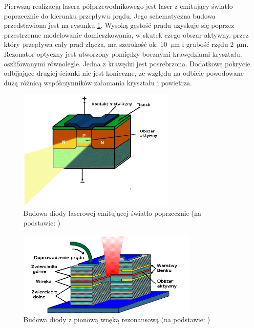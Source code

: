 \documentclass[a4paper,10pt]{article}
\begin{document}
Pierwszą realizacją lasera półprzewodnikowego jest laser z emitujący światło poprzecznie do kierunku przepływu prądu. Jego schematyczna budowa przedstawiona jest na rysunku \ref{rys-eel}. Wysoką gęstość prądu uzyskuje się poprzez przestrzenne modelowanie domieszkowania, w skutek czego obszar aktywny, przez który przepływa cały prąd złącza, ma szerokość ok. 10~$\mathrm{\mu m}$ i grubość rzędu 2~$\mathrm{\mu m}$. Rezonator optyczny jest utworzony pomiędzy bocznymi krawędziami kryształu, oszlifowanymi równolegle. Jedna z krawędzi jest posrebrzona. Dodatkowe pokrycie odbijające drugiej ścianki nie jest konieczne, ze względu na odbicie powodowane dużą różnicą współczynników załamania kryształu i powietrza.

\begin{figure}
\begin{center}
 \includegraphics[width=0.7\textwidth]{./obrazki/rys-eel.png}
\end{center}
\caption{Budowa diody laserowej emitującej światło poprzecznie (na podstawie: \cite{rys-laserki})}
\label{rys-eel}
\end{figure}


\begin{figure}
\begin{center}
 \includegraphics[width=0.8\textwidth]{./obrazki/rys-vcsel.png}
\end{center}
\caption{Budowa diody z pionową wnęką rezonansową (na podstawie: \cite{rys-laserki})}
\label{rys-vcsel}
\end{figure}
\end{document}
